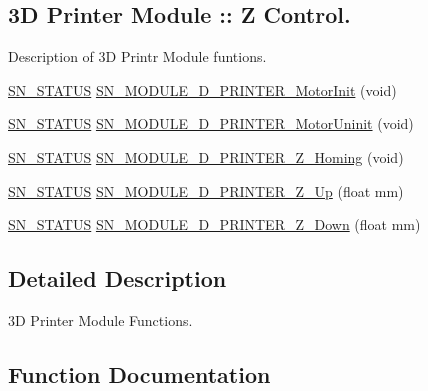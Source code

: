 \subsection*{3D Printer Module \+:\+: Z Control.}
\label{_amgrp0b5aafc53c5099dcb4016e710d2ae272}%
Description of 3D Printr Module funtions. \begin{DoxyCompactItemize}
\item 
\hyperlink{group__SYSTEM__ERROR_ga4540713b9a7a18ce44d78c3a10f7442f}{S\+N\+\_\+\+S\+T\+A\+T\+US} \hyperlink{group__MODULE__3D__PRINTER_ga83ec7a117b45a5760e1aecde26f69dea}{S\+N\+\_\+\+M\+O\+D\+U\+L\+E\+\_\+D\+\_\+\+P\+R\+I\+N\+T\+E\+R\+\_\+\+Motor\+Init} (void)
\item 
\hyperlink{group__SYSTEM__ERROR_ga4540713b9a7a18ce44d78c3a10f7442f}{S\+N\+\_\+\+S\+T\+A\+T\+US} \hyperlink{group__MODULE__3D__PRINTER_ga2f644e451b310348d50fef6c762bbbcc}{S\+N\+\_\+\+M\+O\+D\+U\+L\+E\+\_\+D\+\_\+\+P\+R\+I\+N\+T\+E\+R\+\_\+\+Motor\+Uninit} (void)
\item 
\hyperlink{group__SYSTEM__ERROR_ga4540713b9a7a18ce44d78c3a10f7442f}{S\+N\+\_\+\+S\+T\+A\+T\+US} \hyperlink{group__MODULE__3D__PRINTER_ga7bba4aa3966da87ac001b67b301310c1}{S\+N\+\_\+\+M\+O\+D\+U\+L\+E\+\_\+D\+\_\+\+P\+R\+I\+N\+T\+E\+R\+\_\+\+Z\+\_\+\+Homing} (void)
\item 
\hyperlink{group__SYSTEM__ERROR_ga4540713b9a7a18ce44d78c3a10f7442f}{S\+N\+\_\+\+S\+T\+A\+T\+US} \hyperlink{group__MODULE__3D__PRINTER_ga47326e9f9d52dae584ee7c12011efc64}{S\+N\+\_\+\+M\+O\+D\+U\+L\+E\+\_\+D\+\_\+\+P\+R\+I\+N\+T\+E\+R\+\_\+\+Z\+\_\+\+Up} (float mm)
\item 
\hyperlink{group__SYSTEM__ERROR_ga4540713b9a7a18ce44d78c3a10f7442f}{S\+N\+\_\+\+S\+T\+A\+T\+US} \hyperlink{group__MODULE__3D__PRINTER_ga65e82d5d94b534427c5d036080e77cf0}{S\+N\+\_\+\+M\+O\+D\+U\+L\+E\+\_\+D\+\_\+\+P\+R\+I\+N\+T\+E\+R\+\_\+\+Z\+\_\+\+Down} (float mm)
\end{DoxyCompactItemize}


\subsection{Detailed Description}
3D Printer Module Functions. 



\subsection{Function Documentation}
\mbox{\label{group__MODULE__3D__PRINTER_ga801e265ffe6f8c56081112f4fdd35f39}} 
